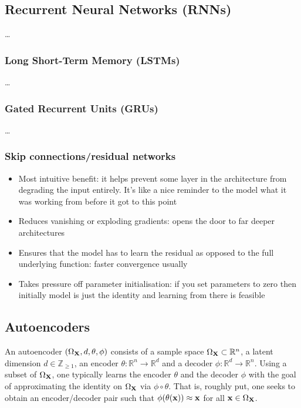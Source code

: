 \documentclass[11pt]{article}
\begin{document}
\subsection{Recurrent Neural Networks (RNNs)}
\dots

\subsubsection{Long Short-Term Memory (LSTMs)}
\dots

\subsubsection{Gated Recurrent Units (GRUs)}
\dots

\subsubsection{Skip connections/residual networks}
\begin{itemize}
    \item Most intuitive benefit: it helps prevent some layer in the architecture from degrading the input entirely. It's like a nice reminder to the model what it was working from before it got to this point
    \item Reduces vanishing or exploding gradients: opens the door to far deeper architectures
    \item Ensures that the model has to learn the residual as opposed to the full underlying function: faster convergence usually
    \item Takes pressure off parameter initialisation: if you set parameters to zero then initially model is just the identity and learning from there is feasible
\end{itemize}

\subsection{Autoencoders}
\label{sec:autoencoders}
An autoencoder $(\Omega_{\mathbf{X}},d,\theta,\phi)$ consists of a sample space $\Omega_{\mathbf{X}}\subset\mathbb{R}^n$, a latent dimension $d\in\mathbb{Z}_{\geq1}$, an encoder $\theta:\mathbb{R}^n\to\mathbb{R}^d$ and a decoder $\phi:\mathbb{R}^d\to\mathbb{R}^n$. Using a subset of $\Omega_{\mathbf{X}}$, one typically learns the encoder $\theta$ and the decoder $\phi$ with the goal of approximating the identity on $\Omega_{\mathbf{X}}$ via $\phi\circ \theta$. That is, roughly put, one seeks to obtain an encoder/decoder pair such that $\phi(\theta(\mathbf{x}))\approx\mathbf{x}$ for all $\mathbf{x}\in\Omega_{\mathbf{X}}$.
\end{document}

